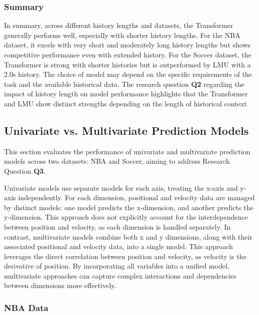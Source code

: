 \subsubsection{Summary}
In summary, across different history lengths and datasets, the Transformer generally performs well, especially with shorter history lengths. For the NBA dataset, it excels with very short and moderately long history lengths but shows competitive performance even with extended history. For the Soccer dataset, the Transformer is strong with shorter histories but is outperformed by LMU with a 2.0s history. The choice of model may depend on the specific requirements of the task and the available historical data. The research question \textbf{Q2} regarding the impact of history length on model performance highlights that the Transformer and LMU show distinct strengths depending on the length of historical context.

\subsection{Univariate vs. Multivariate Prediction Models}
\label{exp:uni_multi}

This section evaluates the performance of univariate and multivariate prediction models across two datasets: NBA and Soccer, aiming to address Research Question \textbf{Q3}.

Univariate models use separate models for each axis, treating the x-axis and y-axis independently. For each dimension, positional and velocity data are managed by distinct models: one model predicts the x-dimension, and another predicts the y-dimension. This approach does not explicitly account for the interdependence between position and velocity, as each dimension is handled separately. In contrast, multivariate models combine both x and y dimensions, along with their associated positional and velocity data, into a single model. This approach leverages the direct correlation between position and velocity, as velocity is the derivative of position. By incorporating all variables into a unified model, multivariate approaches can capture complex interactions and dependencies between dimensions more effectively.

\subsubsection{NBA Data}

